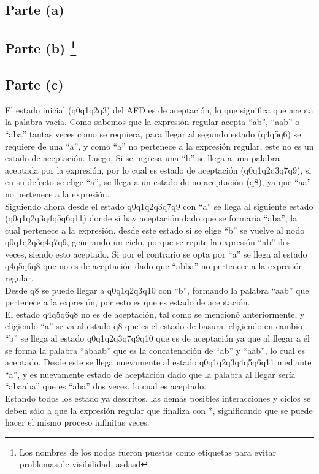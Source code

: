 \documentclass[11pt,letterpaper]{article}
\begin{document}
\subsection{Parte (a)}
\renewcommand{\thefootnote}{\fnsymbol{footnote}}
\subsection{Parte (b) \protect\footnote{Los nombres de los nodos fueron puestos como etiquetas para evitar problemas de visibilidad. asdasd}}


\newpage
\subsection{Parte (c)}

El estado inicial (q0q1q2q3) del AFD es de aceptación, lo que significa que acepta la palabra vacía. Como sabemos que la expresión regular acepta “ab”, “aab” o “aba” tantas veces como se requiera, para llegar al segundo estado (q4q5q6) se requiere de una “a”, y como “a” no pertenece a la expresión regular, este no es un estado de aceptación. Luego, Si se ingresa una “b” se llega a una palabra aceptada por la expresión, por lo cual es estado de aceptación (q0q1q2q3q7q9), si en su defecto se elige “a”, se llega a un estado de no aceptación (q8), ya que “aa” no pertenece a la expresión. \\

Siguiendo ahora desde el estado q0q1q2q3q7q9 con “a” se llega al siguiente estado (q0q1q2q3q4q5q6q11) donde sí hay aceptación dado que se formaría “aba”, la cual pertenece a la expresión, desde este estado si se elige “b” se vuelve al nodo q0q1q2q3q4q7q9, generando un ciclo, porque se repite la expresión “ab” dos veces, siendo esto aceptado. Si por el contrario se opta por “a” se llega al estado q4q5q6q8 que no es de aceptación dado que “abba” no pertenece a la expresión regular. \\

Desde q8 se puede llegar a q0q1q2q3q10 con “b”, formando la palabra “aab” que pertenece a la expresión, por esto es que es estado de aceptación. \\

El estado q4q5q6q8 no es de aceptación, tal como se mencionó anteriormente, y eligiendo “a” se va al estado q8 que es el estado de basura,  eligiendo en cambio “b” se llega al estado q0q1q2q3q7q9q10 que es de aceptación ya que al llegar a él se forma la palabra “abaab” que es la concatenación de “ab” y “aab”, lo cual es aceptado. Desde este se llega nuevamente al estado q0q1q2q3q4q5q6q11 mediante “a”, y es nuevamente estado de aceptación dado que la palabra al llegar sería “abaaba” que es “aba” dos veces, lo cual es aceptado. \\

Estando todos los estado ya descritos, las demás posibles  interacciones y ciclos se deben sólo a que la expresión regular que finaliza con *, significando que se puede hacer el mismo proceso infinitas veces.
\end{document}
